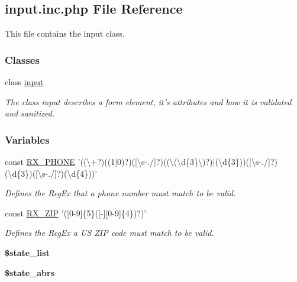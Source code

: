 \hypertarget{input_8inc_8php}{\subsection{input.\-inc.\-php File Reference}
\label{input_8inc_8php}
}


This file contains the input class.  


\subsubsection*{Classes}
\begin{DoxyCompactItemize}
\item 
class \hyperlink{classinput}{input}
\begin{DoxyCompactList}\small\item\em The class input describes a form element, it's attributes and how it is validated and sanitized. \end{DoxyCompactList}\end{DoxyCompactItemize}
\subsubsection*{Variables}
\begin{DoxyCompactItemize}
\item 
\hypertarget{input_8inc_8php_a28a895521a5452ff587c2433af17a5f6}{const \hyperlink{input_8inc_8php_a28a895521a5452ff587c2433af17a5f6}{R\-X\-\_\-\-P\-H\-O\-N\-E} '((\textbackslash{}+?)((1$\vert$0)?)(\mbox{[}\textbackslash{}s-\/./\mbox{]}?)((\textbackslash{}(\textbackslash{}d\{3\}\textbackslash{})?)$\vert$(\textbackslash{}d\{3\}))(\mbox{[}\textbackslash{}s-\/./\mbox{]}?)(\textbackslash{}d\{3\})(\mbox{[}\textbackslash{}s-\/./\mbox{]}?)(\textbackslash{}d\{4\}))'}\label{input_8inc_8php_a28a895521a5452ff587c2433af17a5f6}

\begin{DoxyCompactList}\small\item\em Defines the Reg\-Ex that a phone number must match to be valid. \end{DoxyCompactList}\item 
\hypertarget{input_8inc_8php_a4dc6cafe7e22d63d07d3f9227d01fb07}{const \hyperlink{input_8inc_8php_a4dc6cafe7e22d63d07d3f9227d01fb07}{R\-X\-\_\-\-Z\-I\-P} '(\mbox{[}0-\/9\mbox{]}\{5\}(\mbox{[}-\/\mbox{]}\mbox{[}0-\/9\mbox{]}\{4\})?)'}\label{input_8inc_8php_a4dc6cafe7e22d63d07d3f9227d01fb07}

\begin{DoxyCompactList}\small\item\em Defines the Reg\-Ex a U\-S Z\-I\-P code must match to be valid. \end{DoxyCompactList}\item 
\hypertarget{input_8inc_8php_a1709cc1293c85b37bd08c640d66e07cf}{{\bfseries \$state\-\_\-list}}\label{input_8inc_8php_a1709cc1293c85b37bd08c640d66e07cf}

\item 
{\bfseries \$state\-\_\-abrs}
\end{DoxyCompactItemize}


